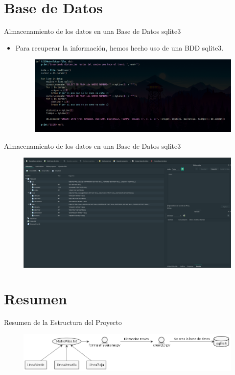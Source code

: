 \documentclass{beamer}
\begin{document}
\section{Base de Datos}
\begin{frame}{Almacenamiento de los datos en una Base de Datos sqlite3}
    \begin{itemize}
        \item Para recuperar la información, hemos hecho uso de una BDD sqlite3.
        \vspace{0.2cm}
        \begin{figure}[H]
          \centering
          \includegraphics[scale=0.20]{"../pics/bddCodigo.png"}
        \end{figure}
    \end{itemize}
\end{frame}
\begin{frame}{Almacenamiento de los datos en una Base de Datos sqlite3}
  \begin{figure}[H]
    \centering
    \includegraphics[scale=0.17]{"../pics/bdd.png"}
  \end{figure}
\end{frame}

\section{Resumen}
\begin{frame}{Resumen de la Estructura del Proyecto}
  \begin{figure}[H]
    \centering
    \includegraphics[scale=0.35]{"../pics/umlBDD.png"}
  \end{figure}
\end{frame}
\end{document}
